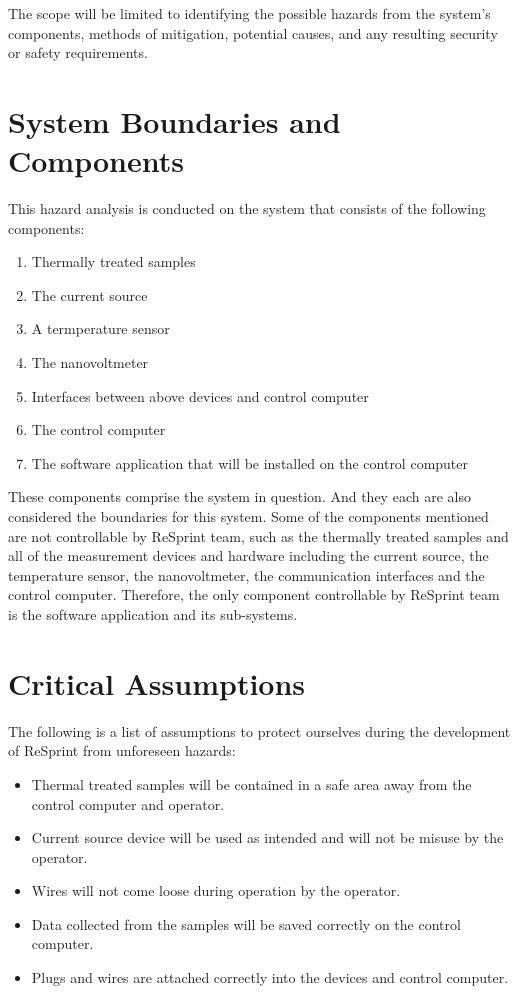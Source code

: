 \documentclass{article}
\begin{document}
\noindent The scope will be limited to identifying the possible hazards from the system's components, methods of mitigation, 
potential causes, and any resulting security or safety requirements.

\section{System Boundaries and Components}

\noindent This hazard analysis is conducted on the system that consists of the following components:

\begin{enumerate}
  \item Thermally treated samples
  \item The current source
  \item A termperature sensor
  \item The nanovoltmeter
  \item Interfaces between above devices and control computer
  \item The control computer
  \item The software application that will be installed on the control computer
\end{enumerate}

\noindent These components comprise the system in question. And they each are also considered the boundaries for this system. Some of the components mentioned are not controllable by ReSprint team, such as the thermally treated samples and all of the measurement devices and hardware including the current source, the temperature sensor, the nanovoltmeter, the communication interfaces and the control computer. Therefore, the only component controllable by ReSprint team is the software application and its sub-systems.

\section{Critical Assumptions}

\noindent The following is a list of assumptions to protect ourselves during the development of ReSprint from unforeseen hazards:

\begin{itemize}
  \item Thermal treated samples will be contained in a safe area away from the control computer and operator. 
  \item Current source device will be used as intended and will not be misuse by the operator.
  \item Wires will not come loose during operation by the operator.
  \item Data collected from the samples will be saved correctly on the control computer.
  \item Plugs and wires are attached correctly into the devices and control computer.
\end{itemize}
\end{document}
